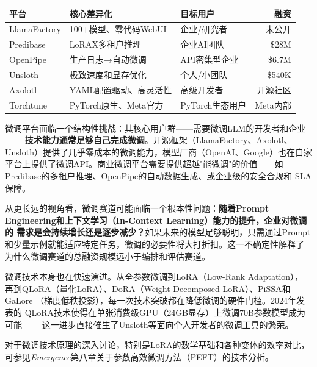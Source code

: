 \begin{keybox}[微调平台对比一览]
\small
\begin{tabularx}{\textwidth}{l X X r}
\toprule
\rowcolor{figLightGray}
\textbf{平台} & \textbf{核心差异化} & \textbf{目标用户} & \textbf{融资} \\
\midrule
LlamaFactory  & 100+模型、零代码WebUI       & 企业/研究者   & 未公开 \\
Predibase     & LoRAX多租户推理              & 企业AI团队    & \$28M \\
OpenPipe      & 生产日志→自动微调            & API密集型企业 & \$6.7M \\
Unsloth       & 极致速度和显存优化           & 个人/小团队   & \$540K \\
Axolotl       & YAML配置驱动、高灵活性       & 高级开发者    & 开源社区 \\
Torchtune     & PyTorch原生、Meta官方        & PyTorch生态用户 & Meta内部 \\
\bottomrule
\end{tabularx}
\end{keybox}

\begin{whybox}
微调平台面临一个结构性挑战：其核心用户群——需要微调LLM的开发者和企业——
\textbf{技术能力通常足够自己完成微调}。开源框架（LlamaFactory、Axolotl、
Unsloth）提供了几乎零成本的微调能力，模型厂商（OpenAI、Google）也在自家
平台上提供了微调API。商业微调平台需要提供超越"能微调"的价值——如
Predibase的多租户推理、OpenPipe的自动数据生成、或企业级的安全合规和
SLA保障。

从更长远的视角看，微调赛道可能面临一个根本性问题：\textbf{随着Prompt
Engineering和上下文学习（In-Context Learning）能力的提升，企业对微调的
需求是会持续增长还是逐步减少？}如果未来的模型足够聪明，只需通过Prompt
和少量示例就能适应特定任务，微调的必要性将大打折扣。这一不确定性解释了
为什么微调赛道的总融资规模远小于编排和评估赛道。
\end{whybox}

微调技术本身也在快速演进。从全参数微调到LoRA（Low-Rank Adaptation），
再到QLoRA（量化LoRA）、DoRA（Weight-Decomposed LoRA）、PiSSA和GaLore
（梯度低秩投影），每一次技术突破都在降低微调的硬件门槛。2024年发表的
QLoRA技术使得在单张消费级GPU（24GB显存）上微调70B参数模型成为可能——
这一进步直接催生了Unsloth等面向个人开发者的微调工具的繁荣。

对于微调技术原理的深入讨论，特别是LoRA的数学基础和各种变体的效率对比，
可参见\textit{Emergence}第八章关于参数高效微调方法（PEFT）的技术分析。

